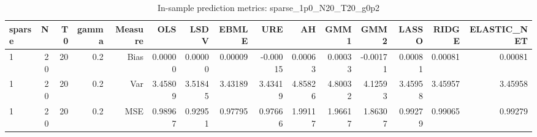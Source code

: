 \begin{table}[!htbp]\centering
\caption{In-sample prediction metrics: sparse_1p0_N20_T20_g0p2}
\label{tab:table2_sparse_1p0_N20_T20_g0p2}
\begin{tabular}{lrrrrrrrrrrrrrr}
\hline
sparse & N & T0 & gamma & Measure & OLS & LSDV & EBMLE & URE & AH & GMM1 & GMM2 & LASSO & RIDGE & ELASTIC_NET \\
\hline
1 & 20 & 20 & 0.2 & Bias & 0.00000 & 0.00000 & 0.00009 & -0.00015 & 0.00063 & 0.00033 & -0.00171 & 0.00081 & 0.00081 & 0.00081 \\
1 & 20 & 20 & 0.2 & Var & 3.45809 & 3.51845 & 3.43189 & 3.43419 & 4.85826 & 4.80032 & 4.12593 & 3.45958 & 3.45957 & 3.45958 \\
1 & 20 & 20 & 0.2 & MSE & 0.98967 & 0.92951 & 0.97795 & 0.97666 & 1.99117 & 1.96617 & 1.86307 & 0.99279 & 0.99065 & 0.99279 \\
\hline
\end{tabular}
\end{table}

